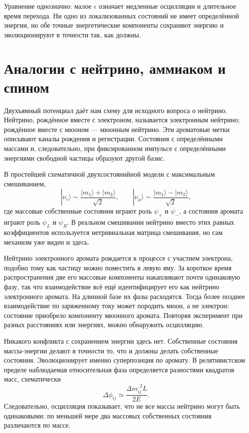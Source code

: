 Уравнение однозначно: малое \(\epsilon\) означает медленные осцилляции и длительное время перехода. Ни одно из локализованных состояний не имеет определённой энергии, но обе точные энергетические компоненты сохраняют энергию и эволюционируют в точности так, как должны.

\section{Аналогии с нейтрино, аммиаком и спином}

Двухъямный потенциал даёт нам схему для исходного вопроса о нейтрино. Нейтрино, рождённое вместе с электроном, называется электронным нейтрино; рождённое вместе с мюоном — мюонным нейтрино. Эти ароматовые метки описывают каналы рождения и регистрации. Состояния с определёнными массами и, следовательно, при фиксированном импульсе с определёнными энергиями свободной частицы образуют другой базис.

В простейшей схематичной двухсостоянийной модели с максимальным смешиванием,
\begin{equation}
|\nu_e\rangle \sim \frac{|m_1\rangle+|m_2\rangle}{\sqrt{2}},
\qquad
|\nu_\mu\rangle \sim \frac{|m_1\rangle-|m_2\rangle}{\sqrt{2}},
\end{equation}
где массовые собственные состояния играют роль \(\psi_+\) и \(\psi_-\), а состояния аромата играют роль \(\psi_L\) и \(\psi_R\). В реальном смешивании нейтрино вместо этих равных коэффициентов используется нетривиальная матрица смешивания, но сам механизм уже виден и здесь.

Нейтрино электронного аромата рождается в процессе с участием электрона, подобно тому как частицу можно поместить в левую яму. За короткое время распространения две его массовые компоненты накапливают почти одинаковую фазу, так что взаимодействие всё ещё идентифицирует его как нейтрино электронного аромата. На длинной базе их фазы расходятся. Тогда более позднее взаимодействие по заряженному току может породить мюон, а не электрон: состояние приобрело компоненту мюонного аромата. Повторяя эксперимент при разных расстояниях или энергиях, можно обнаружить осцилляцию.

Никакого конфликта с сохранением энергии здесь нет. Собственные состояния массы-энергии делают в точности то, что и должны делать собственные состояния. Эволюционирует именно суперпозиция по аромату. В релятивистском пределе наблюдаемая относительная фаза определяется разностями квадратов масс, схематически
\begin{equation}
\Delta\phi_{ij}\simeq \frac{\Delta m_{ij}^{,2}L}{2E}.
\end{equation}
Следовательно, осцилляция показывает, что не все массы нейтрино могут быть одинаковыми; по меньшей мере два массовых собственных состояния различаются по массе.


